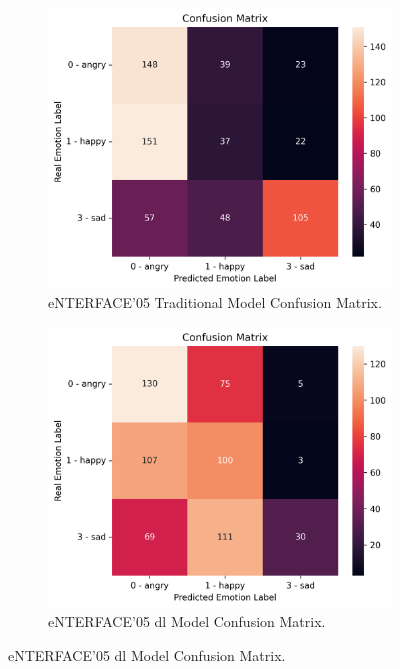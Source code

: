 \begin{figure}
	\centering
	\begin{subfigure}{.5\textwidth}
		\centering
		\includegraphics[width=\linewidth]{figs/4_5_discussion/ent_trad_cm.png}
		\caption{eNTERFACE'05 Traditional Model Confusion Matrix.}
	\end{subfigure}%
	\begin{subfigure}{.5\textwidth}
		\centering
		\includegraphics[width=\linewidth]{figs/4_5_discussion/ent_deep_cm.png}
		\caption{eNTERFACE'05 \ac{dl} Model Confusion Matrix.}
	\end{subfigure}

\end{figure}
